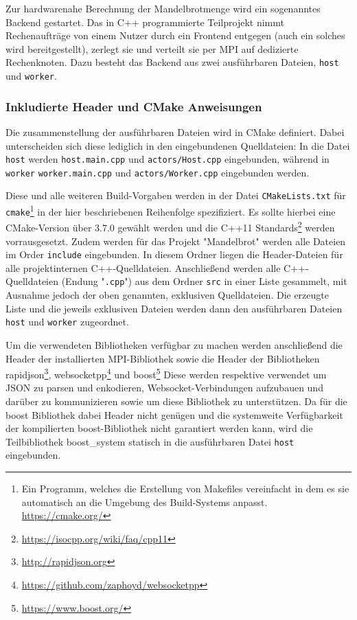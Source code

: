 Zur hardwarenahe Berechnung der Mandelbrotmenge wird ein sogenanntes Backend gestartet.
Das in C++ programmierte Teilprojekt nimmt Rechenaufträge von einem Nutzer durch ein Frontend entgegen (auch
ein solches wird bereitgestellt), zerlegt sie und verteilt sie per MPI auf dedizierte Rechenknoten.
Dazu besteht das Backend aus zwei ausführbaren Dateien, \verb|host| und \verb|worker|.

\subsubsection{Inkludierte Header und CMake Anweisungen}

Die zusammenstellung der ausführbaren Dateien wird in CMake definiert.
Dabei unterscheiden sich diese lediglich in den eingebundenen Quelldateien:
In die Datei \verb|host| werden \verb|host.main.cpp| und \verb|actors/Host.cpp| eingebunden, während
in \verb|worker| \verb|worker.main.cpp| und \verb|actors/Worker.cpp| eingebunden werden.

Diese und alle weiteren Build-Vorgaben werden in der Datei \verb|CMakeLists.txt| für
\verb|cmake|\footnote{Ein Programm, welches die Erstellung von Makefiles vereinfacht in dem es sie automatisch an die Umgebung des Build-Systems anpasst. \url{https://cmake.org/}}
in der hier beschriebenen Reihenfolge spezifiziert.
Es sollte hierbei eine CMake-Version über 3.7.0 gewählt werden und die C++11 Standards\footnote{\url{https://isocpp.org/wiki/faq/cpp11}} werden vorrausgesetzt.
Zudem werden für das Projekt "Mandelbrot" werden alle Dateien im Order \verb|include| eingebunden.
In diesem Ordner liegen die Header-Dateien für alle projektinternen C++-Quelldateien.
Anschließend werden alle C++-Quelldateien (Endung "\verb|.cpp|") aus dem Ordner \verb|src| in einer Liste gesammelt, mit Ausnahme jedoch der oben genannten, exklusiven Quelldateien.
Die erzeugte Liste und die jeweils exklusiven Dateien werden dann den ausführbaren Dateien \verb|host| und \verb|worker| zugeordnet.

Um die verwendeten Bibliotheken verfügbar zu machen werden anschließend die Header der installierten MPI-Bibliothek
sowie die Header der Bibliotheken rapidjson\footnote{\url{http://rapidjson.org}}, websocketpp\footnote{\url{https://github.com/zaphoyd/websocketpp}} und boost\footnote{\url{https://www.boost.org/}}
Diese werden respektive verwendet um JSON zu parsen und enkodieren, Websocket-Verbindungen aufzubauen und darüber zu kommunizieren sowie um diese Bibliothek zu unterstützen.
Da für die boost Bibliothek dabei Header nicht genügen und die systemweite Verfügbarkeit der kompilierten boost-Bibliothek nicht garantiert werden kann, wird die Teilbibliothek boost\_system statisch
in die ausführbaren Datei \verb|host| eingebunden.

